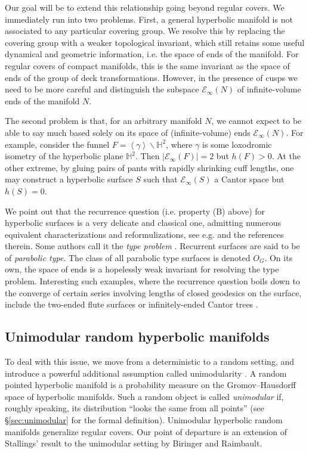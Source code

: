 \documentclass{amsart}
\newcommand{\HH}{\mathbb{H}}
\newcommand{\EndsInf}[1]{\mathcal{E}_{\infty}\left(#1\right)}
\theoremstyle{plain}
\numberwithin{equation}{section}
\theoremstyle{definition}
\begin{document}
Our goal will be to extend this relationship going beyond regular covers. We immediately run into two problems. First, a general hyperbolic manifold is not associated to any particular covering group. We resolve this by replacing the covering group with a weaker topological invariant, which still retains some useful dynamical and geometric information, i.e. the space of ends of the manifold. For regular covers of compact manifolds,  this is the same invariant as the space of ends of the group of deck transformations. However, in the presence of cusps we need to be more careful and distinguish the subspace $\EndsInf{N}$ of infinite-volume ends  of the manifold $N$.

The second problem is that, for an arbitrary manifold $N$, we cannot expect to be able to say much based solely on its space of (infinite-volume) ends $\EndsInf{N}$. For example, consider the funnel $F = \left<\gamma\right> \backslash \HH^2$, where $\gamma$ is some loxodromic isometry of the hyperbolic plane $\HH^2$. Then $|\EndsInf{F}|=2$ but $h(F) > 0$. At the other extreme, by gluing pairs of pants with rapidly shrinking cuff lengths, one may construct a hyperbolic surface $S$ such that $\EndsInf{S}$ a Cantor space but $h(S) = 0$. 

We point out that the recurrence question (i.e. property (B) above) for hyperbolic surfaces is a very delicate and classical one, admitting numerous equivalent characterizations and reformulizations, see e.g. \cite{basmajian2022type} and the references therein. Some authors call it the \emph{type problem} \cite{ahlfors2015riemann}. Recurrent surfaces are said to be of \emph{parabolic type}. The class of all parabolic type surfaces is denoted $O_G$.
On its own, the space of ends is a hopelessly weak invariant for resolving the type problem. Interesting such examples, where the recurrence question boils down to the converge of certain series involving lengths of closed geodesics on the surface, include the two-ended flute surfaces \cite{basmajian1993hyperbolic} or infinitely-ended Cantor trees \cite{mcmullen1998hausdorff,vsaric2024quadratic,pandazis2024nonergodicity,bordenave2026quadratic}.

\subsection{Unimodular random hyperbolic manifolds}
To deal with this issue, we move from a deterministic to a random setting, and introduce a powerful additional assumption called unimodularity \cite{abert2022unimodular}. A random pointed hyperbolic manifold is a probability measure on the Gromov--Hausdorff space of hyperbolic manifolds. Such a random object is called \emph{unimodular} if, roughly speaking, its distribution \enquote{looks the same from all points} (see \S\ref{sec:unimodular}
for the formal definition). Unimodular hyperbolic random manifolds generalize regular covers. Our point of departure is an extension of Stallings' result to the unimodular setting by Biringer and Raimbault.
\end{document}
